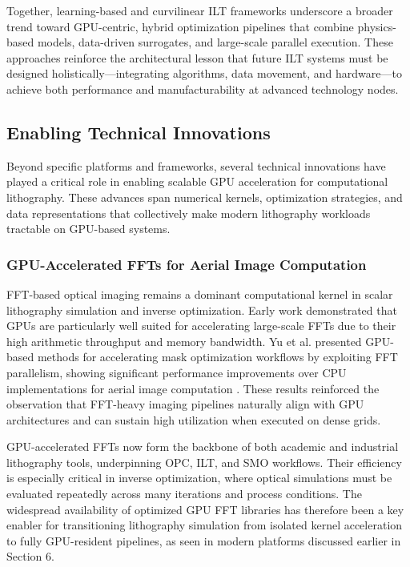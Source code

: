 \documentclass[pdflatex,sn-mathphys-num]{sn-jnl}%
\theoremstyle{thmstyleone}%
\theoremstyle{thmstyletwo}%
\theoremstyle{thmstylethree}%
\begin{document}
Together, learning-based and curvilinear ILT frameworks underscore a broader trend toward GPU-centric, hybrid optimization pipelines that combine physics-based models, data-driven surrogates, and large-scale parallel execution. These approaches reinforce the architectural lesson that future ILT systems must be designed holistically—integrating algorithms, data movement, and hardware—to achieve both performance and manufacturability at advanced technology nodes.

\subsection {Enabling Technical Innovations}
Beyond specific platforms and frameworks, several technical innovations have played a critical role in enabling scalable GPU acceleration for computational lithography. These advances span numerical kernels, optimization strategies, and data representations that collectively make modern lithography workloads tractable on GPU-based systems.
\subsubsection{GPU-Accelerated FFTs for Aerial Image Computation}
FFT-based optical imaging remains a dominant computational kernel in scalar lithography simulation and inverse optimization. Early work demonstrated that GPUs are particularly well suited for accelerating large-scale FFTs due to their high arithmetic throughput and memory bandwidth. Yu et al. presented GPU-based methods for accelerating mask optimization workflows by exploiting FFT parallelism, showing significant performance improvements over CPU implementations for aerial image computation \cite{YuZiyang2023}. These results reinforced the observation that FFT-heavy imaging pipelines naturally align with GPU architectures and can sustain high utilization when executed on dense grids.

GPU-accelerated FFTs now form the backbone of both academic and industrial lithography tools, underpinning OPC, ILT, and SMO workflows. Their efficiency is especially critical in inverse optimization, where optical simulations must be evaluated repeatedly across many iterations and process conditions. The widespread availability of optimized GPU FFT libraries has therefore been a key enabler for transitioning lithography simulation from isolated kernel acceleration to fully GPU-resident pipelines, as seen in modern platforms discussed earlier in Section 6.
\end{document}
